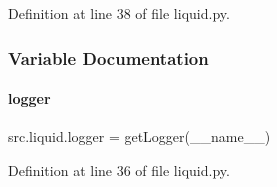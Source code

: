 Definition at line 38 of file liquid.\+py.



\subsubsection{Variable Documentation}
\mbox{\label{namespacesrc_1_1liquid_a94b65ba658e49a2161816eab3db1b1b6}} 
\paragraph{\texorpdfstring{logger}{logger}}
{\footnotesize\ttfamily src.\+liquid.\+logger = get\+Logger(\+\_\+\+\_\+name\+\_\+\+\_\+)}



Definition at line 36 of file liquid.\+py.

